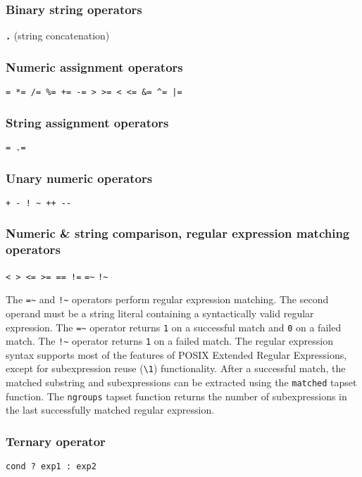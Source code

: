 \documentclass[twoside,english]{article}
\begin{document}
\subsubsection{Binary string operators}
\texttt{\textbf{.}} (string concatenation)

\subsubsection{Numeric assignment operators}
\texttt{= {*}= /= \%= += -= >\,{}>= <\,{}<=
\&= \textasciicircum{}= |=}

\subsubsection{String assignment operators}

\texttt{= .=}

\subsubsection{Unary numeric operators}
\texttt{+ - ! \textasciitilde{} ++ -{}-}

\subsubsection{Numeric \& string comparison, regular expression matching operators}
\texttt{< > <= >= == !=} \verb+=~+ \verb+!~+

The \verb+=~+ and \verb+!~+ operators perform regular expression
matching. The second operand must be a string literal
containing a syntactically valid regular expression. The \verb+=~+ operator returns {\tt 1} on a successful match and \texttt{0} on a failed match.
The \verb+!~+ operator returns {\tt 1} on a failed match.
The regular expression syntax supports most of the features of POSIX Extended
Regular Expressions, except for subexpression reuse (\verb+\1+)
functionality. After a successful match, the matched substring and subexpressions can be extracted using the \texttt{matched} tapset
function. The \texttt{ngroups} tapset function returns the number of
subexpressions in the last successfully matched regular expression.

\subsubsection{Ternary operator\label{sub:Ternary-operator}}
\texttt{cond ? exp1 : exp2}
\end{document}
